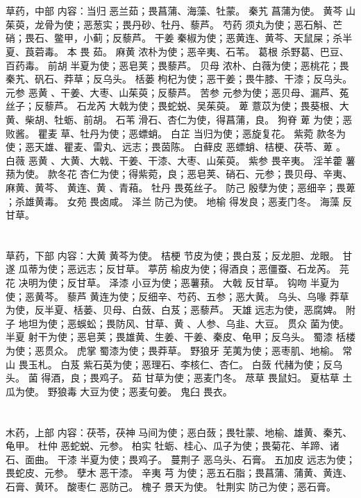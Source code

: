 \documentclass[12pt,UTF8]{ctexbook}
\begin{document}
\section{}草药，中部
内容：当归 恶兰茹；畏菖蒲、海藻、牡蒙。 
秦艽 菖蒲为使。 
黄芩 山茱萸，龙骨为使；恶葱实；畏丹砂、牡丹、藜芦。 
芍药 须丸为使；恶石斛、芒硝；畏石、鳖甲，小蓟；反藜芦。 
干姜 秦椒为使；恶黄连、黄芩、天鼠屎；杀半夏、莨菪毒。 
本 畏 茹。 
麻黄 浓朴为使；恶辛夷、石苇。 
葛根 杀野葛、巴豆、百药毒。 
前胡 半夏为使；恶皂荚；畏藜芦。 
贝母 浓朴、白薇为使；恶桃花；畏秦艽、矾石、莽草；反乌头。 
栝蒌 枸杞为使；恶干姜；畏牛膝、干漆；反乌头。 
元参 恶黄 、干姜、大枣、山茱萸；反藜芦。 
苦参 元参为使；恶贝母、漏芦、菟丝子；反藜芦。 
石龙芮 大戟为使；畏蛇蜕、吴茱萸。 
萆 薏苡为使；畏葵根、大黄、柴胡、牡蛎、前胡。 
石苇 滑石、杏仁为使，得菖蒲，良。 
狗脊 萆 为使；恶败酱。 
瞿麦 草、牡丹为使；恶螵蛸。 
白芷 当归为使；恶旋复花。 
紫菀 款冬为使；恶天雄、瞿麦、雷丸、远志；畏茵陈。 
白藓皮 恶螵蛸、桔梗、茯苓、萆 。 
白薇 恶黄 、大黄、大戟、干姜、干漆、大枣、山茱萸。 
紫参 畏辛夷。 
淫羊藿 薯蓣为使。 
款冬花 杏仁为使；得紫菀，良；恶皂荚、硝石、元参；畏贝母、辛夷、麻黄、黄芩、 
黄连、黄 、青葙。 
牡丹 畏菟丝子。 
防己 殷孽为使；恶细辛；畏萆 ；杀雄黄毒。 
女苑 畏卤咸。 
泽兰 防己为使。 
地榆 得发良；恶麦门冬。 
海藻 反甘草。 


\section{}草药，下部
内容：大黄 黄芩为使。 
桔梗 节皮为使；畏白芨；反龙胆、龙眼。 
甘遂 瓜蒂为使；恶远志；反甘草。 
葶苈 榆皮为使；得酒良；恶僵蚕、石龙芮。 
芫花 决明为使；反甘草。 
泽漆 小豆为使；恶薯蓣。 
大戟 反甘草。 
钩吻 半夏为使；恶黄芩。 
藜芦 黄连为使；反细辛、芍药、五参；恶大黄。 
乌头、乌喙 莽草为使，反半夏、栝蒌、贝母、白蔹、白芨；恶藜芦。 
天雄 远志为使，恶腐婢。 
附子 地坦为使；恶蜈蚣；畏防风、甘草、黄 、人参、乌韭、大豆。 
贯众 菌为使。 
半夏 射干为使；恶皂荚；畏雄黄、生姜、干姜、秦皮、龟甲；反乌头。 
蜀漆 栝楼为使；恶贯众。 
虎掌 蜀漆为使；畏莽草。 
野狼牙 芜荑为使；恶枣肌、地榆。 
常山 畏玉札。 
白芨 紫石英为使；恶理石、李核仁、杏仁。 
白蔹 代赭为使；反乌头。 
菌 得酒，良；畏鸡子。 
茹 甘草为使；恶麦门冬。 
荩草 畏鼠妇。 
夏枯草 土瓜为使。 
野狼毒 大豆为使；恶麦句姜。 
鬼臼 畏衣。 


\section{}木药，上部
内容：茯苓，茯神 马间为使；恶白蔹；畏牡蒙、地榆、雄黄、秦艽、龟甲。 
杜仲 恶蛇蜕、元参。 
柏实 牡蛎、桂心、瓜子为使；畏菊花、羊蹄、诸石、面曲。 
干漆 半夏为使；畏鸡子。 
蔓荆子 恶乌头、石膏。 
五加皮 远志为使；畏蛇皮、元参。 
孽木 恶干漆。 
辛夷 芎 为使；恶五石脂；畏菖蒲、蒲黄、黄连、石膏、黄环。 
酸枣仁 恶防己。 
槐子 景天为使。 
牡荆实 防己为使；恶石膏。 
\end{document}
